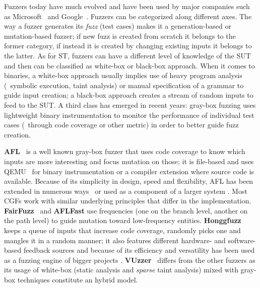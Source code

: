Fuzzers today have much evolved and have been used by major companies such as
Microsoft~\cite{godefroid2008grammar} and
Google~\cite{google2016fuzz,google2011fuzz,google2016oss,google2017oss}. Fuzzers
can be categorized along different axes. The way a fuzzer generates its
\emph{fuzz} (test cases) makes it a generation-based or mutation-based fuzzer;
if new fuzz is created from scratch it belongs to the former category, if
instead it is created by changing existing inputs it belongs to the latter. As
for \ac{ST}, fuzzers can have a different level of knowledge of the \ac{SUT} and
then can be classified as white-box or black-box approach.  When it comes to
binaries, a white-box approach usually implies use of heavy program analysis
(\eg~symbolic execution, taint analysis) or manual specification of a grammar to
guide input creation; a black-box approach creates a stream of random inputs to
feed to the \ac{SUT}. A third class has emerged in recent years: gray-box
fuzzing uses lightweight binary instrumentation to monitor the performance of
individual test cases (\eg~through code coverage or other metric) in order to
better guide fuzz creation.

\textbf{AFL}~\cite{afl} is a well known gray-box fuzzer that uses code coverage
to know which inputs are more interesting and focus mutation on those; it is
file-based and uses QEMU~\cite{bellard2005qemu} for binary instrumentation or a
compiler extension where source code is available. Because of its simplicity in
design, speed and flexibility, AFL has been extended in numerous
ways~\cite{bohme2017coverage,bohme2017directed,lemieux2017fairfuzz} or used as a
component of a larger system
\cite{stephens2016driller,nichols2017faster,li2017steelix}. Most \acp{CGF} work
with similar underlying principles that differ in the implementation.
\textbf{FairFuzz}~\cite{lemieux2017fairfuzz} and \textbf{AFLFast}
\cite{bohme2017coverage} use frequencies (one on the branch level, another on
the path level) to guide mutation toward low-frequency entities.
\textbf{Honggfuzz}~\cite{honggfuzz} keeps a queue of inputs that increase code
coverage, randomly picks one and mangles it in a random manner; it also features
different hardware- and software- based feedback sources and because of its
efficiency and versatility has been used as a fuzzing engine of bigger projects
\cite{grieco2016quickfuzz}. \textbf{VUzzer}~\cite{rawat2017vuzzer} differs from
the other fuzzers as its usage of white-box (static analysis and \emph{sparse}
taint analysis) mixed with gray-box techniques constitute an hybrid model.



